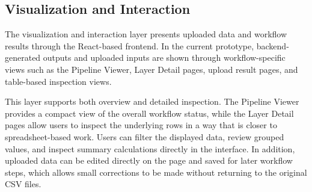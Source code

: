 




\subsection{Visualization and Interaction}

The visualization and interaction layer presents uploaded data and workflow results through the React-based frontend. In the current prototype, backend-generated outputs and uploaded inputs are shown through workflow-specific views such as the Pipeline Viewer, Layer Detail pages, upload result pages, and table-based inspection views.

This layer supports both overview and detailed inspection. The Pipeline Viewer provides a compact view of the overall workflow status, while the Layer Detail pages allow users to inspect the underlying rows in a way that is closer to spreadsheet-based work. Users can filter the displayed data, review grouped values, and inspect summary calculations directly in the interface. In addition, uploaded data can be edited directly on the page and saved for later workflow steps, which allows small corrections to be made without returning to the original CSV files.

